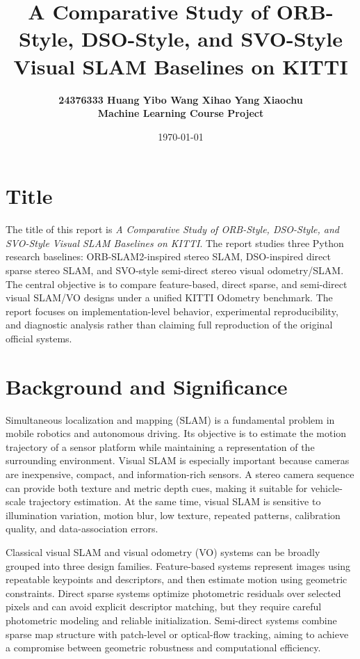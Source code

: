 \documentclass[11pt,a4paper]{article}
\title{A Comparative Study of ORB-Style, DSO-Style, and SVO-Style Visual SLAM Baselines on KITTI}
\author{\large\bfseries 24376333 Huang Yibo \quad 24376267 Wang Xihao \quad 24301017 Yang Xiaochu\\[0.3em]
Machine Learning Course Project}
\date{\today}
\newcommand{\methodorb}{ORB-SLAM2-inspired stereo SLAM}
\newcommand{\methoddso}{DSO-inspired direct sparse stereo SLAM}
\newcommand{\methodsvo}{SVO-style semi-direct stereo visual odometry/SLAM}
\begin{document}
\maketitle

\section{Title}

The title of this report is \emph{A Comparative Study of ORB-Style, DSO-Style, and SVO-Style Visual SLAM Baselines on KITTI}. The report studies three Python research baselines: \methodorb{}, \methoddso{}, and \methodsvo{}. The central objective is to compare feature-based, direct sparse, and semi-direct visual SLAM/VO designs under a unified KITTI Odometry benchmark. The report focuses on implementation-level behavior, experimental reproducibility, and diagnostic analysis rather than claiming full reproduction of the original official systems.

\section{Background and Significance}

Simultaneous localization and mapping (SLAM) is a fundamental problem in mobile robotics and autonomous driving. Its objective is to estimate the motion trajectory of a sensor platform while maintaining a representation of the surrounding environment. Visual SLAM is especially important because cameras are inexpensive, compact, and information-rich sensors. A stereo camera sequence can provide both texture and metric depth cues, making it suitable for vehicle-scale trajectory estimation. At the same time, visual SLAM is sensitive to illumination variation, motion blur, low texture, repeated patterns, calibration quality, and data-association errors.

Classical visual SLAM and visual odometry (VO) systems can be broadly grouped into three design families. Feature-based systems represent images using repeatable keypoints and descriptors, and then estimate motion using geometric constraints. Direct sparse systems optimize photometric residuals over selected pixels and can avoid explicit descriptor matching, but they require careful photometric modeling and reliable initialization. Semi-direct systems combine sparse map structure with patch-level or optical-flow tracking, aiming to achieve a compromise between geometric robustness and computational efficiency.
\end{document}
